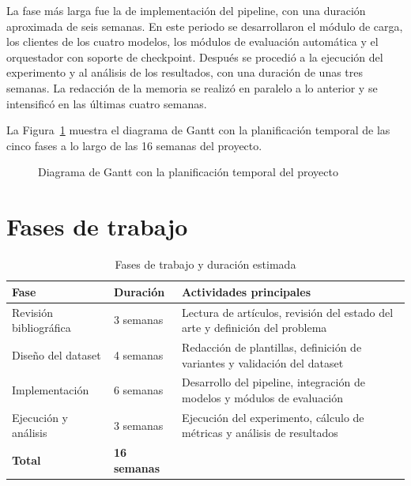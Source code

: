 \documentclass[12pt]{report} %
\renewcommand{\_}{\oldunderscore\allowbreak}
\begin{document}
La fase más larga fue la de implementación del pipeline, con una duración aproximada de seis semanas. En este periodo se desarrollaron el módulo de carga, los clientes de los cuatro modelos, los módulos de evaluación automática y el orquestador con soporte de checkpoint. Después se procedió a la ejecución del experimento y al análisis de los resultados, con una duración de unas tres semanas. La redacción de la memoria se realizó en paralelo a lo anterior y se intensificó en las últimas cuatro semanas.

La Figura~\ref{fig:gantt} muestra el diagrama de Gantt con la planificación temporal de las cinco fases a lo largo de las 16 semanas del proyecto.

\begin{figure}[H]
\centering
{}
\caption{Diagrama de Gantt con la planificación temporal del proyecto}
\label{fig:gantt}
\end{figure}

\section{Fases de trabajo}

\begin{table}[H]
\centering
\begin{tabular}{p{4cm}p{3.5cm}p{6cm}}
\hline
\textbf{Fase} & \textbf{Duración} & \textbf{Actividades principales} \\
\hline
Revisión bibliográfica & 3 semanas & Lectura de artículos, revisión del estado del arte y definición del problema \\
\hline
Diseño del dataset & 4 semanas & Redacción de plantillas, definición de variantes y validación del dataset \\
\hline
Implementación & 6 semanas & Desarrollo del pipeline, integración de modelos y módulos de evaluación \\
\hline
Ejecución y análisis & 3 semanas & Ejecución del experimento, cálculo de métricas y análisis de resultados \\
\hline
\textbf{Total} & \textbf{16 semanas} & \\
\hline
\end{tabular}
\caption{Fases de trabajo y duración estimada}
\label{tab:fases}
\end{table}
\end{document}
